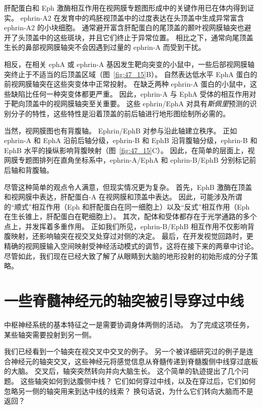 肝配蛋白和 Eph 激酶相互作用在视网膜专题图形成中的关键作用已在体内得到证实。
ephrin-A2 在发育中的鸡胚视顶盖中的过度表达在头顶盖中生成异常富含 ephrin-A2 的小块细胞。
通常避开富含肝配蛋白的尾顶盖的颞叶视网膜轴突也避开了头顶盖中的这些斑块，并且它们终止于异常位置。
相比之下，通常向尾顶盖生长的鼻部视网膜轴突不会因遇到过量的 ephrin-A 而受到干扰。


相反，在相关 ephA 或 ephrin-A 基因发生靶向突变的小鼠中，一些后部视网膜轴突终止于不适当的后顶盖区域（图~\ref{fig:47_15}B）。
自然表达低水平 EphA 蛋白的前视网膜轴突在这些突变体中正常投射。
在缺乏两种 ephrin-A 蛋白的小鼠中，这些缺陷比任何一种突变体都更严重。
因此，ephrin-A 与 EphA 受体的相互作用对于靶向顶盖中的视网膜轴突至关重要。
这些 ephrin/EphA 对具有\textit{斯佩里}预测的识别分子的特性，这些特性是沿着顶盖的前后轴进行地形图绘制所必需的。


当然，视网膜图也有背腹轴。
Ephrin/EphB 对参与沿此轴建立秩序。
正如 ephrin-A 和 EphA 沿前后轴分级，ephrin-B 和 EphB 沿背腹轴分级，ephrin-B 和 EphB 水平的操纵影响背腹映射（图~\ref{fig:47_15}C）。
因此，在简单的层面上，视网膜专题图排列在直角坐标系中，ephrin-A/EphA 和 ephrin-B/EphB 分别标记前后轴和背腹轴。


尽管这种简单的观点令人满意，但现实情况更为复杂。
首先，EphB 激酶在顶盖和视网膜中表达，肝配蛋白-A 在视网膜和顶盖中表达。
因此，可能涉及所谓的“顺式”相互作用（Eph 和肝配蛋白在同一细胞上）以及“反式”相互作用（Eph 在生长锥上，肝配蛋白在靶细胞上）。
其次，配体和受体都存在于光学通路的多个点上，并发挥着多重作用。
正如我们所见，ephrin-B/EphB 相互作用不仅影响背腹映射，还影响轴突在视交叉处穿过对侧的决定。
最后，在开发视觉回路时，更精确的视网膜输入空间映射受神经活动模式的调节，这将在接下来的两章中讨论。
尽管如此，我们现在已经大致了解了从眼睛到大脑的地形投射的初始形成的分子策略。



\section{一些脊髓神经元的轴突被引导穿过中线}

中枢神经系统的基本特征之一是需要协调身体两侧的活动。
为了完成这项任务，某些轴突需要投射到另一侧。


我们已经看到一个轴突在视交叉中交叉的例子。
另一个被详细研究过的例子是连合神经元的轴突交叉，这些神经元将感觉信息从脊髓传递到脊髓腹侧中线穿过底板的大脑。
交叉后，轴突突然转向并向大脑生长。
这个简单的轨迹提出了几个问题。
这些轴突如何到达腹侧中线？
它们如何穿过中线，以及在穿过后，它们如何忽略另一侧的轴突用来到达中线的线索？
换句话说，为什么它们转向大脑而不是返回？



